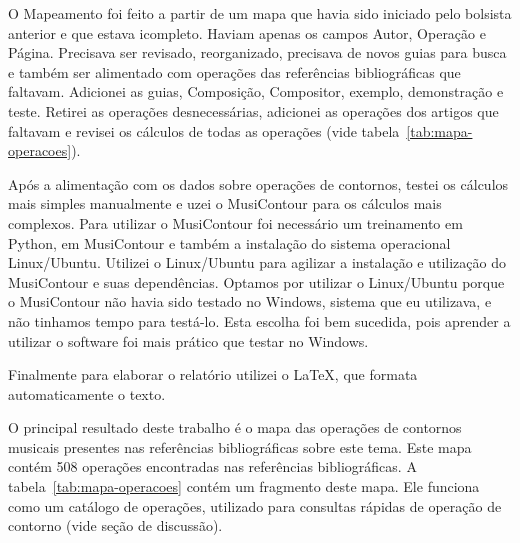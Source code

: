 \documentclass[11pt]{article}
\begin{document}
O Mapeamento foi feito a partir de um mapa que havia sido iniciado
pelo bolsista anterior e que estava icompleto.
Haviam apenas os campos Autor, Operação e Página. Precisava ser
revisado, reorganizado, precisava de novos guias para busca e também
ser alimentado com operações das referências bibliográficas que
faltavam. Adicionei as guias, Composição, Compositor, exemplo,
demonstração e teste. Retirei as operações desnecessárias, adicionei
as operações dos artigos que faltavam e revisei os cálculos de todas
as operações (vide tabela~\ref{tab:mapa-operacoes}).

Após a alimentação com os dados sobre operações de contornos,
testei os cálculos mais simples manualmente e uzei o MusiContour para
os cálculos mais complexos. Para utilizar o MusiContour foi necessário um
treinamento em Python, em MusiContour e também a instalação do sistema
operacional Linux/Ubuntu. Utilizei o Linux/Ubuntu para agilizar a
instalação e utilização do MusiContour e suas dependências.
Optamos por utilizar o Linux/Ubuntu porque o MusiContour não havia
sido testado no Windows, sistema que eu utilizava, e não tinhamos tempo
para testá-lo. Esta escolha foi bem sucedida, pois aprender
a utilizar o software foi mais prático que testar no Windows.

Finalmente para elaborar o relatório utilizei o \LaTeX, que formata
automaticamente o texto.

\label{sec:resultados}


O principal resultado deste trabalho é o mapa das operações de
contornos musicais presentes nas referências bibliográficas sobre este
tema. Este mapa contém 508 operações encontradas nas referências
bibliográficas. A tabela~\ref{tab:mapa-operacoes} contém um fragmento
deste mapa. Ele funciona como um catálogo de operações, utilizado para
consultas rápidas de operação de contorno (vide seção de discussão).
\end{document}
